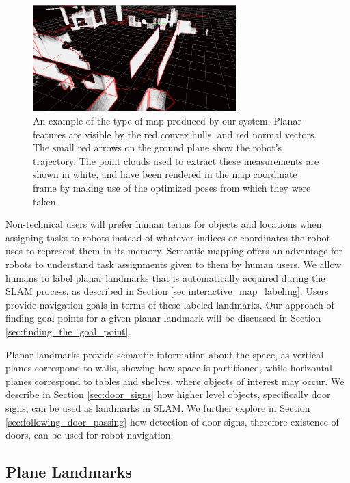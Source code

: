 \documentclass{tADR2e}
\begin{document}
\begin{figure}[ht!]
\begin{center}
\centering
\includegraphics[width=0.7\textwidth]{pics/semantic_map}
\caption{An example of the type of map produced by our system. Planar features
are visible by the red convex hulls, and red normal vectors. The small red arrows on
the ground plane show the robot’s trajectory. The point clouds used to extract these
measurements are shown in white, and have been rendered in the map coordinate
frame by making use of the optimized poses from which they were taken.} 
\label{fig:semantic_map}
\end{center}
\end{figure}


Non-technical users will prefer human terms
for objects and locations when assigning tasks to robots instead of whatever indices or coordinates the robot uses to represent them in its memory. Semantic mapping offers an advantage for robots to understand task assignments given to them by human users. We allow humans to label planar landmarks that is automatically acquired during the SLAM process, as described in Section \ref{sec:interactive_map_labeling}. Users provide navigation goals in terms of these labeled landmarks. Our approach of finding goal points for a given planar landmark will be discussed in Section \ref{sec:finding_the_goal_point}.

Planar landmarks provide semantic information about the space, as vertical planes correspond to walls, showing how space is partitioned, while horizontal planes correspond to tables and shelves, where objects of interest may occur. We describe in Section \ref{sec:door_signs} how higher level objects, specifically door signs, can be used as landmarks in SLAM.  We further explore in Section \ref{sec:following_door_passing} how detection of door signs, therefore existence of doors, can be used for robot navigation.

\subsection{Plane Landmarks}
\end{document}
